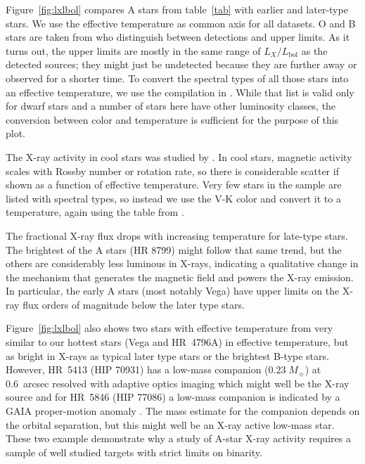 \documentclass[preprint2]{aastex631}
\begin{document}
Figure~\ref{fig:lxlbol} compares A stars from table~\ref{tab} with earlier and later-type stars. We use the effective temperature as common axis for all datasets. 
O and B stars are taken from \citet{1996A&AS..118..481B} who distinguish between detections and upper limits. As it turns out, the upper limits are mostly in the same range of $L_X/L_\mathrm{bol}$ as the detected sources; they might just be undetected because they are further away or observed for a shorter time. To convert the spectral types of all those stars into an effective temperature, we use the compilation in \citet{2013ApJS..208....9P}. While that list is valid only for dwarf stars and a number of stars here have other luminosity classes, the conversion between color and temperature is sufficient for the purpose of this plot.

The X-ray activity in cool stars was studied by \citet{2011ApJ...743...48W}. In cool stars, magnetic activity scales with Rossby number or rotation rate, so there is considerable scatter if shown as a function of effective temperature. Very few stars in the sample are listed with spectral types, so instead we use the V-K color and convert it to a temperature, again using the table from \citet{2013ApJS..208....9P}.

The fractional X-ray flux drops with increasing temperature for late-type stars. The brightest of the A stars (HR 8799) might follow that same trend, but the others are considerably less luminous in X-rays, indicating a qualitative change in the mechanism that generates the magnetic field and powers the X-ray emission. In particular, the early A stars (most notably Vega) have upper limits on the X-ray flux orders of magnitude below the later type stars. 

Figure~\ref{fig:lxlbol} also shows two stars with effective temperature from \citet{1996A&AS..118..481B} very similar to our hottest stars (Vega and HR~4796A) in effective temperature, but as bright in X-rays as typical later type stars or the brightest B-type stars. However, HR~5413 (HIP 70931) has a low-mass companion ($0.23\;M_\sun$) at 0.6~arcsec resolved with adaptive optics imaging \citep{2014MNRAS.437.1216D} which might well be the X-ray source and for HR~5846 (HIP 77086) a low-mass companion is indicated by a GAIA proper-motion anomaly \citep{2019A&A...623A..72K}. The mass estimate for the companion depends on the orbital separation, but this might well be an X-ray active low-mass star. These two example demonstrate why a study of A-star X-ray activity requires a sample of well studied targets with strict limits on binarity.
\end{document}

